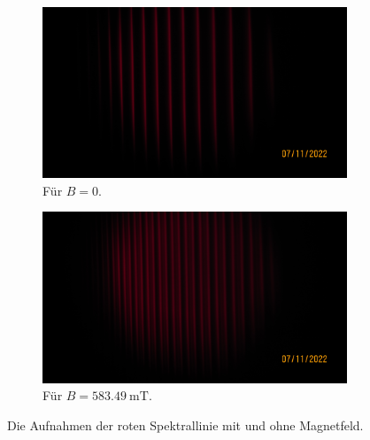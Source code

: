   \begin{figure}%
    \begin{subfigure}{0.48\textwidth}%
      \centering%
      \includegraphics{../pictures/IMG_0005.JPG}%
      \caption{Für $B = \num{0}$.}%
      \label{fig:pic_rot_0}%
    \end{subfigure}%
    \hfill%
    \begin{subfigure}{0.48}%
      \centering%
      \includegraphics{../pictures/IMG_0006.JPG}%
      \caption{Für $B = \SI{583.49}{\milli\tesla}$.}%
      \label{fig:pic_rot_B}%
    \end{subfigure}%
    \caption{Die Aufnahmen der roten Spektrallinie mit und ohne Magnetfeld.}%
    \label{fig:rot}%
  \end{figure}

